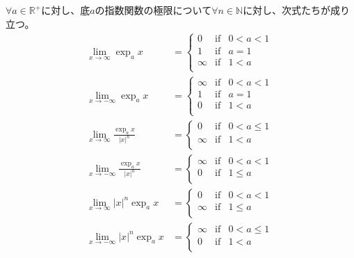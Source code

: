 \documentclass[dvipdfmx]{jsarticle}
\begin{document}
\begin{thm}\label{4.3.3.15}
$\forall a \in \mathbb{R}^{+}$に対し、底$a$の指数関数の極限について$\forall n \in \mathbb{N}$に対し、次式たちが成り立つ。
\begin{align*}
\lim_{x \rightarrow \infty}{\exp_{a}x} &= \left\{ \begin{matrix}
0 & \mathrm{if} & 0 < a < 1 \\
1 & \mathrm{if} & a = 1 \\
\infty & \mathrm{if} & 1 < a \\
\end{matrix} \right.\ \\
\lim_{x \rightarrow - \infty}{\exp_{a}x} &= \left\{ \begin{matrix}
\infty & \mathrm{if} & 0 < a < 1 \\
1 & \mathrm{if} & a = 1 \\
0 & \mathrm{if} & 1 < a \\
\end{matrix} \right.\ \\
\lim_{x \rightarrow \infty}\frac{\exp_{a}x}{|x|^{n}} &= \left\{ \begin{matrix}
0 & \mathrm{if} & 0 < a \leq 1 \\
\infty & \mathrm{if} & 1 < a \\
\end{matrix} \right.\ \\
\lim_{x \rightarrow - \infty}\frac{\exp_{a}x}{|x|^{n}} &= \left\{ \begin{matrix}
\infty & \mathrm{if} & 0 < a < 1 \\
0 & \mathrm{if} & 1 \leq a \\
\end{matrix} \right.\ \\
\lim_{x \rightarrow \infty}{|x|^{n}\exp_{a}x} &= \left\{ \begin{matrix}
0 & \mathrm{if} & 0 < a < 1 \\
\infty & \mathrm{if} & 1 \leq a \\
\end{matrix} \right.\ \\
\lim_{x \rightarrow - \infty}{|x|^{n}\exp_{a}x} &= \left\{ \begin{matrix}
\infty & \mathrm{if} & 0 < a \leq 1 \\
0 & \mathrm{if} & 1 < a \\
\end{matrix} \right.
\end{align*}
\end{thm}
\end{document}
